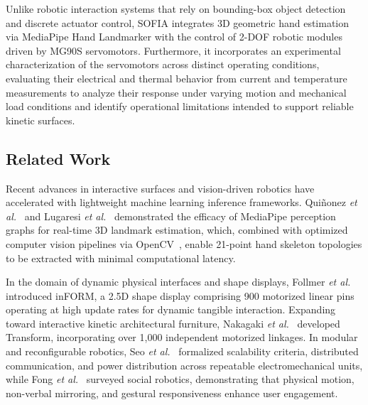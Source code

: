 \documentclass[lettersize,journal]{IEEEtran}
\begin{document}
	Unlike robotic interaction systems that rely on bounding-box object detection and discrete actuator control, SOFIA integrates 3D geometric hand estimation via MediaPipe Hand Landmarker with the control of 2-DOF robotic modules driven by MG90S servomotors. Furthermore, it incorporates an experimental characterization of the servomotors across distinct operating conditions, evaluating their electrical and thermal behavior from current and temperature measurements to analyze their response under varying motion and mechanical load conditions and identify operational limitations intended to support reliable kinetic surfaces.
	
	\subsection{Related Work}
	\label{sec:related_work}
	
	Recent advances in interactive surfaces and vision-driven robotics have accelerated with lightweight machine learning inference frameworks. Qui{\~n}onez \textit{et al.}~\cite{quinonez2022mediapipe} and Lugaresi \textit{et al.}~\cite{lugaresi2019mediapipe} demonstrated the efficacy of MediaPipe perception graphs for real-time 3D landmark estimation, which, combined with optimized computer vision pipelines via OpenCV~\cite{bradski2000opencv}, enable 21-point hand skeleton topologies to be extracted with minimal computational latency.
	
	In the domain of dynamic physical interfaces and shape displays, Follmer \textit{et al.}~\cite{follmer2013inform} introduced inFORM, a 2.5D shape display comprising 900 motorized linear pins operating at high update rates for dynamic tangible interaction. Expanding toward interactive kinetic architectural furniture, Nakagaki \textit{et al.}~\cite{nakagaki2016transform} developed Transform, incorporating over 1,000 independent motorized linkages. In modular and reconfigurable robotics, Seo \textit{et al.}~\cite{seo2019modular} formalized scalability criteria, distributed communication, and power distribution across repeatable electromechanical units, while Fong \textit{et al.}~\cite{fong2003social} surveyed social robotics, demonstrating that physical motion, non-verbal mirroring, and gestural responsiveness enhance user engagement.
	
\end{document}
